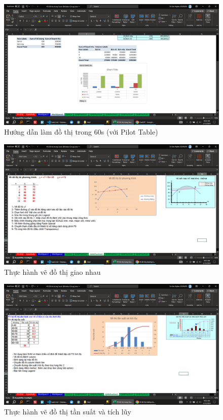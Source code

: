\documentclass{article}
\begin{document}
\begin{figure}[H]
    \centering
    \includegraphics[scale = 0.15]{Bai2/HuongDan/4.png}
    \caption{Hướng dẫn làm đồ thị trong 60s (với Pilot Table)}
\end{figure}

\begin{figure}[H]
    \centering
    \includegraphics[scale = 0.15]{Bai2/ThucHanh/0.png}
    \caption{Thực hành vẽ đồ thị giao nhau}
\end{figure}

\begin{figure}[H]
    \centering
    \includegraphics[scale = 0.15]{Bai2/ThucHanh/1.png}
    \caption{Thực hành vẽ đồ thị tần suất và tích lũy}
\end{figure}
\end{document}
